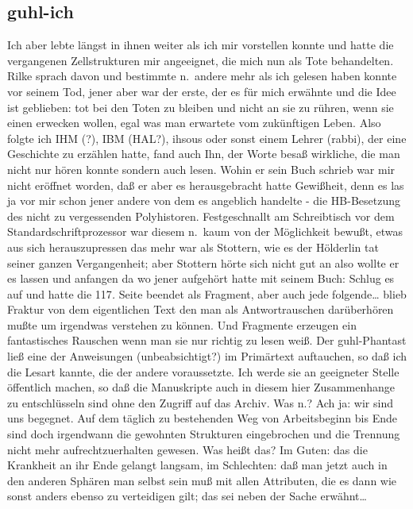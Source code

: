 \documentclass[
]{article}
\author{}
\date{\vspace{-2.5em}}
\begin{document}
\subsection{guhl-ich}\label{guhl-ich}

Ich aber lebte längst in ihnen weiter als ich mir vorstellen konnte und
hatte die vergangenen Zellstrukturen mir angeeignet, die mich nun als
Tote behandelten. Rilke sprach davon und bestimmte n.~andere mehr als
ich gelesen haben konnte vor seinem Tod, jener aber war der erste, der
es für mich erwähnte und die Idee ist geblieben: tot bei den Toten zu
bleiben und nicht an sie zu rühren, wenn sie einen erwecken wollen, egal
was man erwartete vom zukünftigen Leben. Also folgte ich IHM (?), IBM
(HAL?), ihsous oder sonst einem Lehrer (rabbi), der eine Geschichte zu
erzählen hatte, fand auch Ihn, der Worte besaß wirkliche, die man nicht
nur hören konnte sondern auch lesen. Wohin er sein Buch schrieb war mir
nicht eröffnet worden, daß er aber es herausgebracht hatte Gewißheit,
denn es las ja vor mir schon jener andere von dem es angeblich handelte
- die HB-Besetzung des nicht zu vergessenden Polyhistoren.
Festgeschnallt am Schreibtisch vor dem Standardschriftprozessor war
diesem n.~kaum von der Möglichkeit bewußt, etwas aus sich
herauszupressen das mehr war als Stottern, wie es der Hölderlin tat
seiner ganzen Vergangenheit; aber Stottern hörte sich nicht gut an also
wollte er es lassen und anfangen da wo jener aufgehört hatte mit seinem
Buch: Schlug es auf und hatte die 117\emph{.} Seite beendet als
Fragment, aber auch jede folgende\ldots{} blieb Fraktur von dem
eigentlichen Text den man als Antwortrauschen darüberhören mußte um
irgendwas verstehen zu können. Und Fragmente erzeugen ein fantastisches
Rauschen wenn man sie nur richtig zu lesen weiß. Der guhl-Phantast ließ
eine der Anweisungen (unbeabsichtigt?) im Primärtext auftauchen, so daß
ich die Lesart kannte, die der andere voraussetzte. Ich werde sie an
geeigneter Stelle öffentlich machen, so daß die Manuskripte auch in
diesem hier Zusammenhange zu entschlüsseln sind ohne den Zugriff auf das
Archiv. Was n.? Ach ja: wir sind uns begegnet. Auf dem täglich zu
bestehenden Weg von Arbeitsbeginn bis Ende sind doch irgendwann die
gewohnten Strukturen eingebrochen und die Trennung nicht mehr
aufrechtzuerhalten gewesen. Was heißt das? Im Guten: das die Krankheit
an ihr Ende gelangt langsam, im Schlechten: daß man jetzt auch in den
anderen Sphären man selbst sein muß mit allen Attributen, die es dann
wie sonst anders ebenso zu verteidigen gilt; das sei neben der Sache
erwähnt\ldots{}\\
\end{document}
